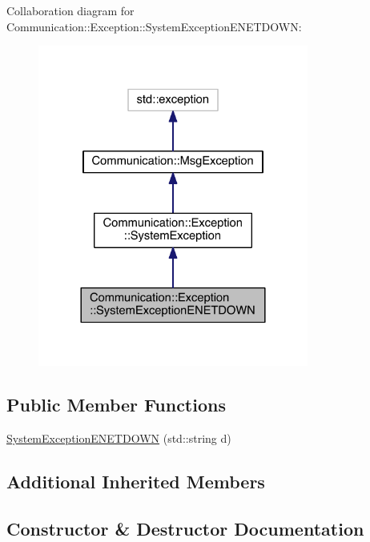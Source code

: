 Collaboration diagram for Communication\+:\+:Exception\+:\+:System\+Exception\+E\+N\+E\+T\+D\+O\+W\+N\+:\nopagebreak
\begin{figure}[H]
\begin{center}
\leavevmode
\includegraphics[width=252pt]{class_communication_1_1_exception_1_1_system_exception_e_n_e_t_d_o_w_n__coll__graph}
\end{center}
\end{figure}
\subsection*{Public Member Functions}
\begin{DoxyCompactItemize}
\item 
\hyperlink{class_communication_1_1_exception_1_1_system_exception_e_n_e_t_d_o_w_n_adc055804ce603e0db735dd7337a11661}{System\+Exception\+E\+N\+E\+T\+D\+O\+W\+N} (std\+::string d)
\end{DoxyCompactItemize}
\subsection*{Additional Inherited Members}


\subsection{Constructor \& Destructor Documentation}
\hypertarget{class_communication_1_1_exception_1_1_system_exception_e_n_e_t_d_o_w_n_adc055804ce603e0db735dd7337a11661}{}
